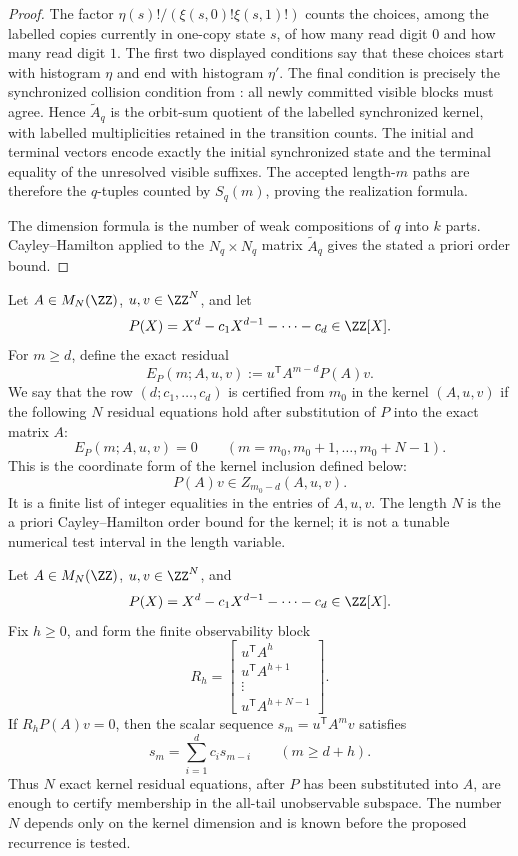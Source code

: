 \begin{proof}
The factor
\(\eta(s)!/(\xi(s,0)!\xi(s,1)!)\) counts the choices, among the labelled copies
currently in one-copy state \(s\), of how many read digit \(0\) and how many read
digit \(1\).  The first two displayed conditions say that these choices start
with histogram \(\eta\) and end with histogram \(\eta'\).  The final condition
is precisely the synchronized collision condition from
: all newly committed visible blocks
must agree.  Hence \(\widetilde A_q\) is the orbit-sum quotient of the labelled
synchronized kernel, with labelled multiplicities retained in the transition
counts.  The initial and terminal vectors encode exactly the initial synchronized
state and the terminal equality of the unresolved visible suffixes.  The
accepted length-\(m\) paths are therefore the \(q\)-tuples counted by
\(S_q(m)\), proving the realization formula.

The dimension formula is the number of weak compositions of \(q\) into
\(k\) parts.  Cayley--Hamilton applied to the \(N_q\times N_q\) matrix
\(\widetilde A_q\) gives the stated a priori order bound.
\end{proof}

\begin{definition}
\label{def:residual-certificate-row}
Let \(A\in M_N(\ZZ)\), \(u,v\in\ZZ^N\), and let
\[
  P(X)=X^d-c_1X^{d-1}-\cdots-c_d\in\ZZ[X].
\]
For \(m\ge d\), define the exact residual
\[
  E_P(m;A,u,v):=u^{\mathsf T}A^{m-d}P(A)v.
\]
We say that the row \((d;c_1,\dots,c_d)\) is certified from \(m_0\) in the
kernel \((A,u,v)\) if the following \(N\) residual equations hold after
substitution of \(P\) into the exact matrix \(A\):
\[
  E_P(m;A,u,v)=0
  \qquad(m=m_0,m_0+1,\dots,m_0+N-1).
\]
This is the coordinate form of the kernel inclusion defined below:
\[
  P(A)v\in Z_{m_0-d}(A,u,v).
\]
It is a finite list of integer equalities in the entries of \(A,u,v\).  The
length \(N\) is the a priori Cayley--Hamilton order bound for the kernel; it is
not a tunable numerical test interval in the length variable.
\end{definition}

\begin{lemma}
\label{lem:direct-residual-certificate}
Let \(A\in M_N(\ZZ)\), \(u,v\in\ZZ^N\), and
\[
  P(X)=X^d-c_1X^{d-1}-\cdots-c_d\in\ZZ[X].
\]
Fix \(h\ge0\), and form the finite observability block
\[
  R_h=
  \begin{bmatrix}
  u^{\mathsf T}A^h\\
  u^{\mathsf T}A^{h+1}\\
  \vdots\\
  u^{\mathsf T}A^{h+N-1}
  \end{bmatrix}.
\]
If \(R_hP(A)v=0\), then the scalar sequence
\(s_m=u^{\mathsf T}A^mv\) satisfies
\[
  s_m=\sum_{i=1}^d c_i s_{m-i}
  \qquad(m\ge d+h).
\]
Thus \(N\) exact kernel residual equations, after \(P\) has been substituted
into \(A\), are enough to certify membership in the all-tail unobservable
subspace.  The number \(N\) depends only on the kernel dimension and is known
before the proposed recurrence is tested.
\end{lemma}

